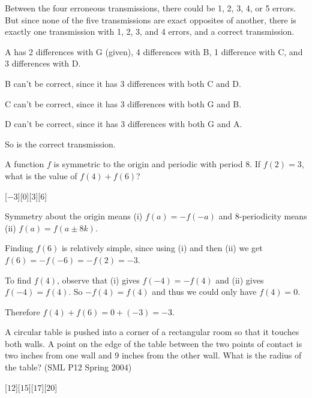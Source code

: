 \begin{solution}[A]
    Between the four erroneous transmissions, there could be 1, 2, 3, 4, or 5 errors. But since none of the five transmissions are exact opposites of another, there is exactly one transmission with 1, 2, 3, and 4 errors, and a correct transmission. 
    
    A has 2 differences with G (given), 4 differences with B, 1 difference with C, and 3 differences with D.

    B can't be correct, since it has 3 differences with both C and D.

    C can't be correct, since it has 3 differences with both G and B.

    D can't be correct, since it has 3 differences with both G and A.

    So  is the correct transmission.
\end{solution}

\begin{problem}
    A function $f$ is symmetric to the origin and periodic with period 8. If $f(2) = 3$, what is the value of $f(4) + f(6)$?
\end{problem}
[$-3$][$0$][$3$][$6$]

\begin{solution}[B]
    Symmetry about the origin means (i) $f(a)=-f(-a)$ and 8-periodicity means (ii) $f(a)=f(a\pm8k)$. 

    Finding $f(6)$ is relatively simple, since using (i) and then (ii) we get $f(6) = -f(-6) = -f(2) = -3$.

    To find $f(4)$, observe that (i) gives $f(-4) = -f(4)$ and (ii) gives $f(-4) = f(4)$. So $-f(4)=f(4)$ and thus we could only have $f(4)=0$.

    Therefore $f(4) + f(6) = 0 + (-3) = \boxed{-3}$.
\end{solution}

\begin{problem}
    A circular table is pushed into a corner of a rectangular room so that it touches both walls. A point on the edge of the table between the two points of contact is two inches from one wall and 9 inches from the other wall. What is the radius of the table? (SML P12 Spring 2004)
\end{problem}
[$12$][$15$][$17$][$20$]

